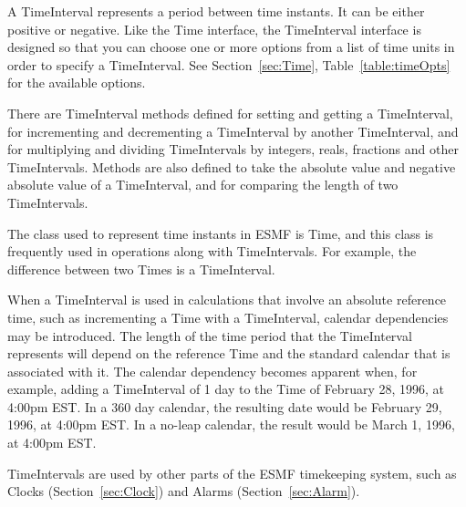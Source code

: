
A TimeInterval represents a period between time instants.  
It can be either positive or negative.  Like the Time interface, 
the TimeInterval interface is designed so that you can choose 
one or more options from a list of time units in order 
to specify a TimeInterval.  See Section~\ref{sec:Time}, 
Table~\ref{table:timeOpts} for the available options.

There are TimeInterval methods defined for setting and getting 
a TimeInterval, for incrementing and decrementing a TimeInterval 
by another TimeInterval, and for multiplying and dividing 
TimeIntervals by integers, reals, fractions and other TimeIntervals.  
Methods are also defined to take the absolute value and negative 
absolute value of a TimeInterval, and for comparing the length of two
TimeIntervals.

The class used to represent time instants in ESMF is Time,
and this class is frequently used in operations along with 
TimeIntervals.  For example, the difference between two
Times is a TimeInterval.  

When a TimeInterval is used in calculations that involve an absolute 
reference time, such as incrementing a Time with a TimeInterval, calendar 
dependencies may be introduced.  The length of the time period that the 
TimeInterval represents will depend on the reference Time and the 
standard calendar that is associated with it.  The calendar dependency becomes 
apparent when, for example, adding a TimeInterval of 1 day to the Time 
of February 28, 1996, at 4:00pm EST.  In a 360 day calendar, the 
resulting date would be February 29, 1996, at 4:00pm EST.  In a no-leap 
calendar, the result would be March 1, 1996, at 4:00pm EST.

TimeIntervals are used by other parts of the ESMF timekeeping
system, such as Clocks (Section~\ref{sec:Clock}) and Alarms 
(Section~\ref{sec:Alarm}).





